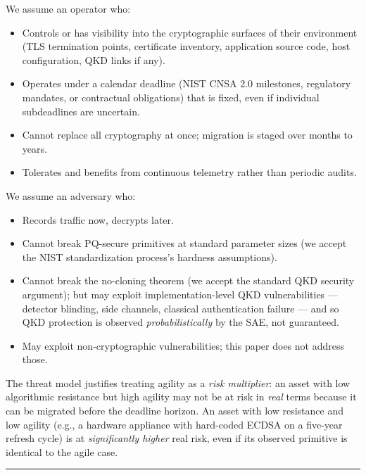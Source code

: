 We assume an operator who:

\begin{itemize}
\tightlist
\item
  Controls or has visibility into the cryptographic surfaces of their
  environment (TLS termination points, certificate inventory,
  application source code, host configuration, QKD links if any).
\item
  Operates under a calendar deadline (NIST CNSA 2.0 milestones,
  regulatory mandates, or contractual obligations) that is fixed, even
  if individual subdeadlines are uncertain.
\item
  Cannot replace all cryptography at once; migration is staged over
  months to years.
\item
  Tolerates and benefits from continuous telemetry rather than periodic
  audits.
\end{itemize}

We assume an adversary who:

\begin{itemize}
\tightlist
\item
  Records traffic now, decrypts later.
\item
  Cannot break PQ-secure primitives at standard parameter sizes (we
  accept the NIST standardization process's hardness assumptions).
\item
  Cannot break the no-cloning theorem (we accept the standard QKD
  security argument); but may exploit implementation-level QKD
  vulnerabilities --- detector blinding, side channels, classical
  authentication failure --- and so QKD protection is observed
  \emph{probabilistically} by the SAE, not guaranteed.
\item
  May exploit non-cryptographic vulnerabilities; this paper does not
  address those.
\end{itemize}

The threat model justifies treating agility as a \emph{risk multiplier}:
an asset with low algorithmic resistance but high agility may not be at
risk in \emph{real} terms because it can be migrated before the deadline
horizon. An asset with low resistance and low agility (e.g., a hardware
appliance with hard-coded ECDSA on a five-year refresh cycle) is at
\emph{significantly higher} real risk, even if its observed primitive is
identical to the agile case.

\begin{center}\rule{0.5\linewidth}{0.5pt}\end{center}

